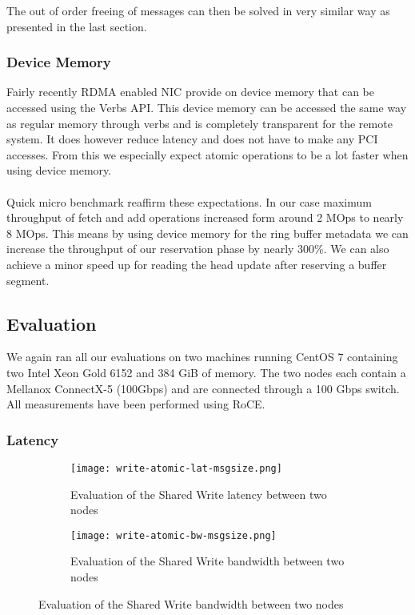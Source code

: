 The out of order freeing of messages can then be solved in very similar way as presented in the last section.


\subsubsection{Device Memory}
Fairly recently RDMA enabled NIC provide on device memory that can be accessed using the Verbs API. This device memory can 
be accessed the same way as regular memory through verbs and is completely transparent for the remote system. It does however
reduce latency and does not have to make any PCI accesses. From this we especially expect atomic operations to be a lot faster
when using device memory.

\paragraph{} Quick micro benchmark reaffirm these expectations. In our case maximum throughput of fetch and add operations 
increased form around 2 MOps to nearly 8 MOps. This means by using device memory for the ring buffer metadata we can increase
the throughput of our reservation phase by nearly 300\%. We can also achieve a minor speed up for reading the head update after
reserving a buffer segment.

\subsection{Evaluation}

We again ran all our evaluations on two machines running CentOS 7 containing two Intel Xeon Gold 6152 and 384 GiB of
memory. The two nodes each contain a Mellanox ConnectX-5 (100Gbps) and are connected through a 100 Gbps switch. 
All measurements have been performed using RoCE.

\subsubsection{Latency}

\begin{figure}[]
\begin{subfigure}[b]{0.49\textwidth}
  \centering
  \texttt{[image: write-atomic-lat-msgsize.png]}
  \caption{Evaluation of the Shared Write latency between two nodes}
  \label{fig:plot-write-atomic-lat}
\end{subfigure}
\begin{subfigure}[b]{0.49\textwidth}
  \centering
  \texttt{[image: write-atomic-bw-msgsize.png]}
  \caption{Evaluation of the Shared Write bandwidth between two nodes}
  \label{fig:plot-write-atomic-bw}
\end{subfigure}
\end{figure}

